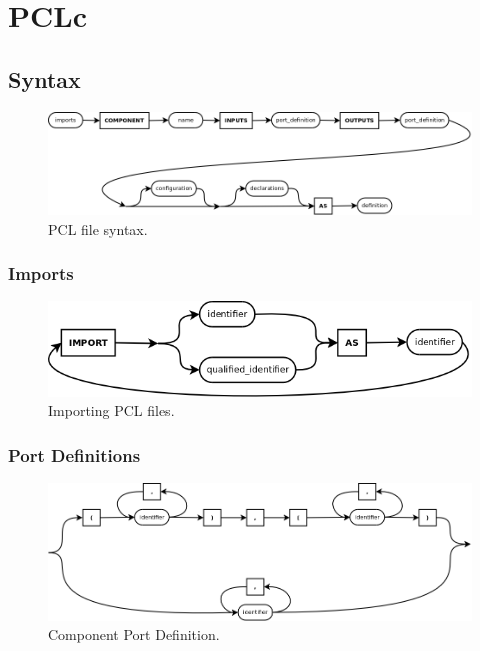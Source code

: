 \chapter{PCLc}

\section{Syntax}
\begin{figure}[!h]
  \centering
    \includegraphics[width=1.0\textwidth]{chapters/compiler/diagrams/pcl-top-level}
  \caption{PCL file syntax.}
  \label{fig:pcl-top-level}
\end{figure}

\subsection{Imports}
\begin{figure}[!h]
  \centering
    \includegraphics[width=1.0\textwidth]{chapters/compiler/diagrams/pcl-imports}
  \caption{Importing PCL files.}
  \label{fig:pcl-imports}
\end{figure}

\subsection{Port Definitions}
\begin{figure}[!h]
  \centering
    \includegraphics[width=1.0\textwidth]{chapters/compiler/diagrams/pcl-port-defs}
  \caption{Component Port Definition.}
  \label{fig:pcl-port-defs}
\end{figure}

